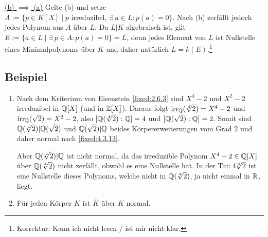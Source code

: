 \underline{(b) $\implies$ (a)} Gelte (b) und setze $A := \{p \in K[X] \mid p \text{ irreduzibel},~\exists~a \in L : p(a) = 0\}$. Nach (b) zerfällt jedoch jedes Polynom aus $A$ über $L$. Da $L|K$ algebraisch ist, gilt $E := \{a \in L \mid \exists~p \in A : p(a)=0\} =L$, denn jedes Element von $L$ ist Nullstelle eines Minimalpolynoms über $K$ und daher natürlich $L = k(E)$.\footnote{Korrektur: Kann ich nicht lesen / ist mir nicht klar.}

\subsection{Beispiel}
\begin{enumerate}[label=(\alph*)]
	\item
		Nach dem Kriterium von Eisenstein \ref{fixed:2.6.3} sind $X^4-2$ und $X^2-2$ irreduzibel in $\mathbb Q[X]$ (und in $\mathbb Z[X]$). Daraus folgt $\operatorname{irr}_\mathbb Q(\sqrt[4]{2}) = X^4-2$ und $\operatorname{irr}_\mathbb Q(\sqrt 2) = X^2-2$, also $[\mathbb Q(\sqrt[4]{2}) : \mathbb Q] = 4$ und $[\mathbb Q(\sqrt 2) : \mathbb Q] = 2$. Somit sind $\mathbb Q(\sqrt[4]{2})|\mathbb Q(\sqrt 2)$ und $\mathbb Q(\sqrt2)|\mathbb Q$ beides Körpererweiterungen vom Grad $2$ und daher normal nach \ref{fixed:4.3.13}.
		
		Aber $\mathbb Q(\sqrt[4]{2})|\mathbb Q$ ist nicht normal, da das irreduzible Polynom $X^4-2 \in \mathbb Q[X]$ über $\mathbb Q(\sqrt[4]{2})$ nicht zerfällt, obwohl es eine Nullstelle hat. In der Tat: $\mathring\imath\sqrt[4]{2}$ ist eine Nullstelle dieses Polynoms, welche nicht in $\mathbb Q(\sqrt[4]{2})$, ja nicht einmal in $\mathbb R$, liegt.
		
	\item
		Für jeden Körper $K$ ist $\bar K$ über $K$ normal.
\end{enumerate}
